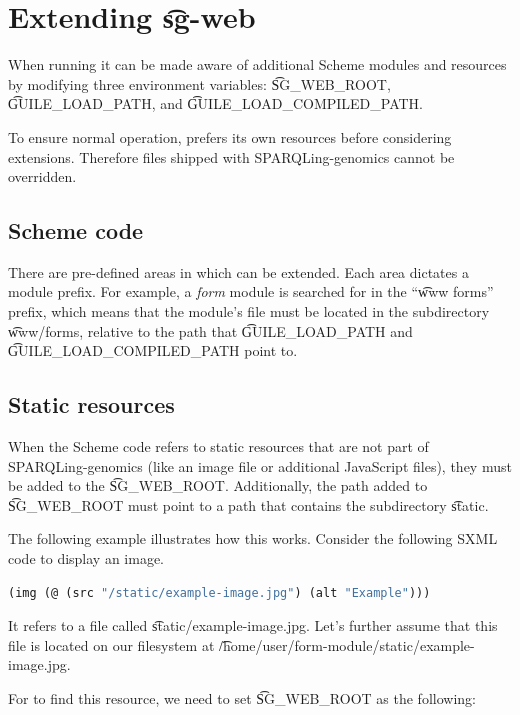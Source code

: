\section{Extending \t{sg-web}}

  When running  it can be made aware of additional Scheme modules and
  resources by modifying three environment variables:
  \t{SG\_WEB\_ROOT}, \t{GUILE\_LOAD\_PATH}, and \t{GUILE\_LOAD\_COMPILED\_PATH}.

  To ensure normal operation,  prefers its own resources
  before considering extensions.  Therefore files shipped with SPARQLing-genomics
  cannot be overridden.

\subsection{Scheme code}

  There are pre-defined areas in which  can be extended.  Each
  area dictates a module prefix.  For example, a \emph{form} module is searched
  for in the ``\t{www forms}'' prefix, which means that the module's file must
  be located in the subdirectory \t{www/forms}, relative to the path that
  \t{GUILE\_LOAD\_PATH} and \t{GUILE\_LOAD\_COMPILED\_PATH} point to.

\subsection{Static resources}

  When the Scheme code refers to static resources that are not part of
  SPARQLing-genomics (like an image file or additional JavaScript files),
  they must be added to the \t{SG\_WEB\_ROOT}.  Additionally, the path added to
  \t{SG\_WEB\_ROOT} must point to a path that contains the subdirectory
  \t{static}.

  The following example illustrates how this works.  Consider the following
  SXML code to display an image.

\begin{lstlisting}[language=Lisp]
(img (@ (src "/static/example-image.jpg") (alt "Example")))
\end{lstlisting}

  It refers to a file called \t{static/example-image.jpg}.  Let's further
  assume that this file is located on our filesystem at
  \t{/home/user/form-module/static/example-image.jpg}.

  For  to find this resource, we need to set \t{SG\_WEB\_ROOT}
  as the following:

